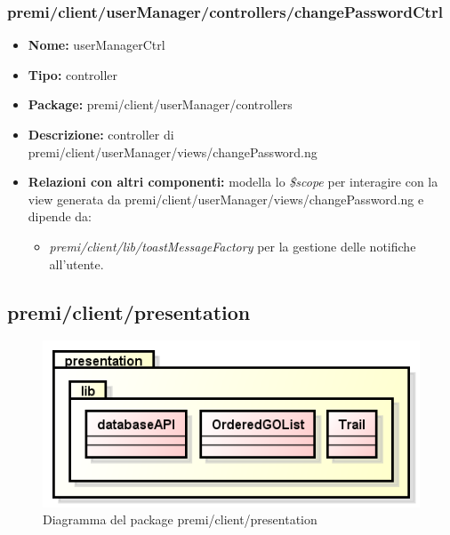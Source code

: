 \subsubsection{premi/client/userManager/controllers/changePasswordCtrl}
\begin{itemize}
  \item[] \textbf{Nome:} userManagerCtrl
  \item[] \textbf{Tipo:} controller
  \item[] \textbf{Package:} premi/client/userManager/controllers
  \item[] \textbf{Descrizione:} controller di premi/client/userManager/views/changePassword.ng
  \item[] \textbf{Relazioni con altri componenti:} modella lo \textit{\$scope} per interagire con la view generata da premi/client/userManager/views/changePassword.ng e dipende da:
  \begin{itemize}
   \item \textit{premi/client/lib/toastMessageFactory} per la gestione delle notifiche all'utente.
  \end{itemize}
\end{itemize}

\subsection{premi/client/presentation}
\begin{figure}[!h]
\begin{center}
\includegraphics[scale=0.45]{img/diapkg/presentation.png}
\caption{Diagramma del package premi/client/presentation}
\end{center}
\end{figure}


